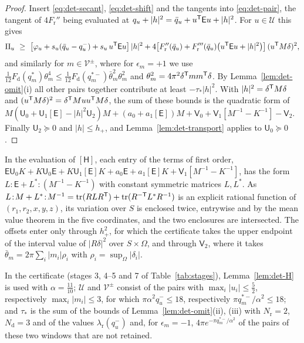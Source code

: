 \begin{proof}
Insert \eqref{eq:det-secant}, \eqref{eq:det-shift} and the tangents into \eqref{eq:det-pair}, the tangent of $4F_{\mathrm r}''$ being
evaluated at $q_u+|h|^2=\bar q_u+u^\mathsf T\mathsf Eu+|h|^2$. For $u\in\mathcal U$ this gives
\[
  \Pi_u\ \ge\ \bigl[\varphi_u+s_u(\bar q_u-q_u^-)+s_u\,u^\T\mathsf Eu\bigr]\,|h|^2
     +4\bigl[F_{\mathrm r}''(\bar q_u)+F_{\mathrm r}'''(\bar q_u)\bigl(u^\T\mathsf Eu+|h|^2\bigr)\bigr]\,(u^\T M\delta)^2 ,
\]
and similarly for $m\in\mathcal V^\pm$, where for $\epsilon_m=+1$ we use
$\frac1{12}F_{\mathrm d}(q_m^*)\theta_m^4\le\frac1{12}F_{\mathrm d}(q_m^{*-})\bar\theta_m^2\theta_m^2$ and
$\theta_m^2=4\pi^2\delta^\mathsf T mm^\mathsf T\delta$. By Lemma~\ref{lem:det-omit}(i) all other pairs together contribute at least
$-\tau_*|h|^2$. With $|h|^2=\delta^\mathsf T M\delta$ and $(u^\mathsf T M\delta)^2=\delta^\mathsf T Muu^\mathsf T M\delta$, the sum of these bounds is the
quadratic form of
$M(\mathsf U_0+\mathsf U_1[\mathsf E]-|h|^2\mathsf U_2)M+(a_0+a_1[\mathsf E])M+\mathsf V_0+\mathsf V_1[M^{-1}-K^{-1}]-\mathsf V_2$.
Finally $\mathsf U_2\succeq0$ and $|h|\le h_+$, and Lemma~\ref{lem:det-transport} applies to $\mathsf U_0\succeq0$.
\end{proof}

In the evaluation of $[\mathsf H]$, each entry of the terms of first order,
$\mathsf E\mathsf U_0K+K\mathsf U_0\mathsf E+K\mathsf U_1[\mathsf E]K+a_0\mathsf E+a_1[\mathsf E]K+\mathsf V_1[M^{-1}-K^{-1}]$, has the form
$L\!:\!\mathsf E+L^*\!:\!(M^{-1}-K^{-1})$ with constant symmetric matrices $L,L^*$. As
$L\!:\!M+L^*\!:\!M^{-1}=\operatorname{tr}(RLR^\mathsf T)+\operatorname{tr}(R^{-\mathsf T}L^*R^{-1})$ is an explicit rational function of $(r_1,r_2,x,y,z)$, its variation over
$S$ is enclosed twice, entrywise and by the mean value theorem in the five coordinates, and the two enclosures are intersected. The
offsets enter only through $h_+^2$, for which the certificate takes the upper endpoint of the interval value of $|R\delta|^2$ over
$S\times\Omega$, and through $\mathsf V_2$, where it takes $\bar\theta_m=2\pi\sum_i|m_i|\rho_i$ with $\rho_i=\sup_\Omega|\delta_i|$.

\begin{remark}[Parameters]\label{rem:det-variants}
In the certificate (stages 3, 4--5 and 7 of Table~\ref{tab:stages}), Lemma~\ref{lem:det-H} is used with $\alpha=\frac{11}{10}$;
$\mathcal U$ and $\mathcal V^\pm$ consist of the pairs with $\max_i|u_i|\le\frac52$, respectively $\max_i|m_i|\le3$, for which
$\pi\alpha^2q_u^-\le18$, respectively $\pi q_m^{*-}/\alpha^2\le18$; and $\tau_*$ is the sum of the bounds of
Lemma~\ref{lem:det-omit}\textup{(ii)}, \textup{(iii)} with $N_{\mathrm r}=2$, $N_{\mathrm d}=3$ and of the values
$\lambda_{\mathrm r}(q_u^-)$ and, for $\epsilon_m=-1$, $4\pi e^{-\pi q_m^{*-}/\alpha^2}$ of the pairs of these two windows that are not
retained.
\end{remark}

